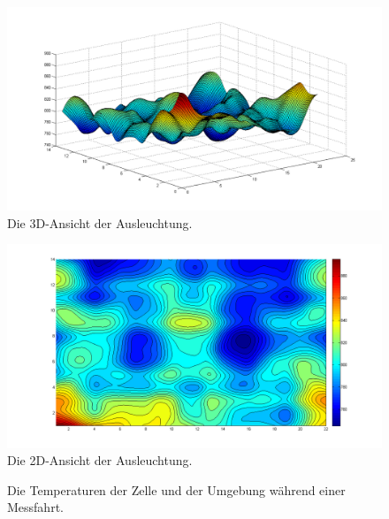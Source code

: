 \documentclass[a4paper,bibtotoc,oneside]{scrbook}
\begin{document}
\begin{figure}[htbp]
\centering
\includegraphics[width=125mm]{img/g3d.png}
\caption{Die 3D-Ansicht der Ausleuchtung.}\label{g3d}
\end{figure}

\begin{figure}[htbp]
\centering
\includegraphics[width=125mm]{img/g2d.png}
\caption{Die 2D-Ansicht der Ausleuchtung.}\label{g2d}
\end{figure}

\begin{figure} [htbp]
\caption{Die Temperaturen der Zelle und der Umgebung während einer Messfahrt.}
\label{t}
\end{figure} 
\end{document}
